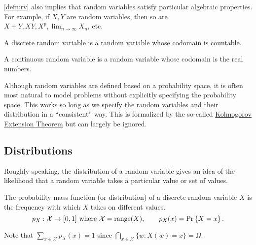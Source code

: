 \cref{defn:rv} also implies that random variables satisfy particular algebraic properties.
For example, if $X,Y$ are random variables, then so are $X+Y, XY, X^p, \lim_{n\to\infty}X_n$, etc.
\begin{definition}
  A discrete random variable is a random variable whose codomain is countable.
  \label{defn:drv}
\end{definition}
\begin{definition}
  A continuous random variable is a random variable whose codomain is the real numbers.
  \label{defn:crv}
\end{definition}
Although random variables are defined based on a probability space, it is often most natural to model problems without explicitly specifying the probability space.
This works so long as we specify the random variables and their distribution in a ``consistent'' way. 
This is formalized by the so-called \href{https://en.wikipedia.org/wiki/Kolmogorov_extension_theorem}{Kolmogorov Extension Theorem} but can largely be ignored.
\subsection{Distributions}
Roughly speaking, the distribution of a random variable gives an idea of the likelihood that a random variable takes a particular value or set of values.
\begin{definition}
  The probability mass function (or distribution) of a discrete random variable $X$ is the frequency with which $X$ takes on different values.
  \[
	p_X:\mathcal{X} \rightarrow [0, 1] \text{ where } \mathcal{X} = \text{range}(X),\qquad p_X(x) = \text{Pr}\left\{X=x\right\}.
  \]
  \label{defn:pmf}
\end{definition}
Note that $\sum_{x\in\mathcal{X}}p_X(x) = 1$ since $\bigcap_{x\in\mathcal{X}}\{w: X(w) = x\} = \Omega$.

